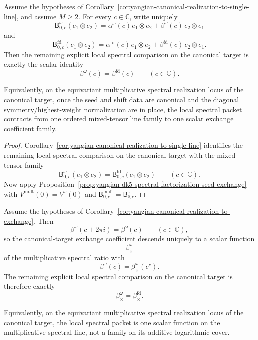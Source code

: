 \begin{corollary}
\label{cor:yangian-canonical-realization-to-exchange}
Assume the hypotheses of
Corollary~\ref{cor:yangian-canonical-realization-to-single-line}, and
assume \(M\ge 2\).  For every \(c\in\mathbb C\), write uniquely
\[
\mathsf B_{0,c}^{\omega}(e_1\otimes e_2)
=
\alpha^\omega(c)\,e_1\otimes e_2
+\beta^\omega(c)\,e_2\otimes e_1
\]
and
\[
\mathsf B_{0,c}^{\mathrm{fd}}(e_1\otimes e_2)
=
\alpha^{\mathrm{fd}}(c)\,e_1\otimes e_2
+\beta^{\mathrm{fd}}(c)\,e_2\otimes e_1.
\]
Then the remaining explicit local spectral comparison on the canonical
target is exactly the scalar identity
\[
\beta^\omega(c)=\beta^{\mathrm{fd}}(c)
\qquad (c\in\mathbb C).
\]

Equivalently, on the equivariant multiplicative spectral realization
locus of the canonical target, once the seed and shift data are
canonical and the diagonal symmetry/highest-weight normalization are in
place, the local spectral packet contracts from one ordered
mixed-tensor line family to one scalar exchange coefficient family.
\end{corollary}

\begin{proof}
Corollary~\ref{cor:yangian-canonical-realization-to-single-line}
identifies the remaining local spectral comparison on the canonical
target with the mixed-tensor family
\[
\mathsf B_{0,c}^{\omega}(e_1\otimes e_2)
=
\mathsf B_{0,c}^{\mathrm{fd}}(e_1\otimes e_2)
\qquad (c\in\mathbb C).
\]
Now apply
Proposition~\ref{prop:yangian-dk5-spectral-factorization-seed-exchange}
with \(V^{\mathrm{mult}}(0)=V^\omega(0)\) and
\(\mathsf B_{0,c}^{\mathrm{mult}}=\mathsf B_{0,c}^{\omega}\).
\end{proof}

\begin{corollary}
\label{cor:yangian-canonical-realization-to-exchange-mult}
Assume the hypotheses of
Corollary~\ref{cor:yangian-canonical-realization-to-exchange}.  Then
\[
\beta^\omega(c+2\pi i)=\beta^\omega(c)
\qquad (c\in\mathbb C),
\]
so the canonical-target exchange coefficient descends uniquely to a
scalar function
\[
\beta_\times^\omega
\]
of the multiplicative spectral ratio with
\[
\beta^\omega(c)=\beta_\times^\omega(e^c).
\]
The remaining explicit local spectral comparison on the canonical
target is therefore exactly
\[
\beta_\times^\omega=\beta_\times^{\mathrm{fd}}.
\]

Equivalently, on the equivariant multiplicative spectral realization
locus of the canonical target, the local spectral packet is one scalar
function on the multiplicative spectral line, not a family on its
additive logarithmic cover.
\end{corollary}

